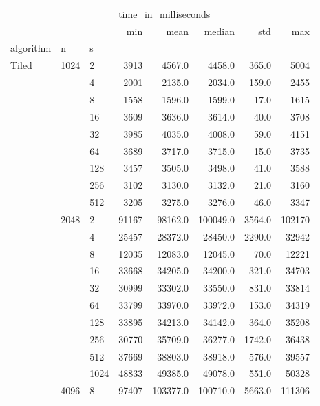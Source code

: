 \begin{tabular}{lllrrrrr}
\toprule
      &      &      & \multicolumn{5}{l}{time\_in\_milliseconds} \\
      &      &      &                  min &      mean &    median &     std &     max \\
algorithm & n & s &                      &           &           &         &         \\
\midrule
Tiled & 1024 & 2    &                 3913 &    4567.0 &    4458.0 &   365.0 &    5004 \\
      &      & 4    &                 2001 &    2135.0 &    2034.0 &   159.0 &    2455 \\
      &      & 8    &                 1558 &    1596.0 &    1599.0 &    17.0 &    1615 \\
      &      & 16   &                 3609 &    3636.0 &    3614.0 &    40.0 &    3708 \\
      &      & 32   &                 3985 &    4035.0 &    4008.0 &    59.0 &    4151 \\
      &      & 64   &                 3689 &    3717.0 &    3715.0 &    15.0 &    3735 \\
      &      & 128  &                 3457 &    3505.0 &    3498.0 &    41.0 &    3588 \\
      &      & 256  &                 3102 &    3130.0 &    3132.0 &    21.0 &    3160 \\
      &      & 512  &                 3205 &    3275.0 &    3276.0 &    46.0 &    3347 \\
      & 2048 & 2    &                91167 &   98162.0 &  100049.0 &  3564.0 &  102170 \\
      &      & 4    &                25457 &   28372.0 &   28450.0 &  2290.0 &   32942 \\
      &      & 8    &                12035 &   12083.0 &   12045.0 &    70.0 &   12221 \\
      &      & 16   &                33668 &   34205.0 &   34200.0 &   321.0 &   34703 \\
      &      & 32   &                30999 &   33302.0 &   33550.0 &   831.0 &   33814 \\
      &      & 64   &                33799 &   33970.0 &   33972.0 &   153.0 &   34319 \\
      &      & 128  &                33895 &   34213.0 &   34142.0 &   364.0 &   35208 \\
      &      & 256  &                30770 &   35709.0 &   36277.0 &  1742.0 &   36438 \\
      &      & 512  &                37669 &   38803.0 &   38918.0 &   576.0 &   39557 \\
      &      & 1024 &                48833 &   49385.0 &   49078.0 &   551.0 &   50328 \\
      & 4096 & 8    &                97407 &  103377.0 &  100710.0 &  5663.0 &  111306 \\
\bottomrule
\end{tabular}
